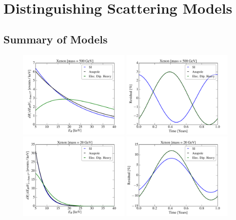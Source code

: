 \documentclass[11pt]{article}
\begin{document}
\section{Distinguishing Scattering Models}\label{sec:procedure}

\subsection{Summary of Models}


\begin{figure}
\centering
\includegraphics[width=0.49\textwidth, trim=0.cm 0.0cm 0.cm 0.0cm,clip=true]{plots/RecoilComparison_500GeV.pdf}
\includegraphics[width=0.49\textwidth, trim=0.cm 0.0cm 0.cm 0.0cm,clip=true]{plots/Xenon_SIvsAnapole_500GeV_Residual_Theory.pdf}
\includegraphics[width=0.49\textwidth, trim=0.cm 0.0cm 0.cm 0.0cm,clip=true]{plots/RecoilComparison_20GeV.pdf}
\includegraphics[width=0.49\textwidth, trim=0.cm 0.0cm 0.cm 0.0cm,clip=true]{plots/Xenon_SIvsAnapole_20GeV_Residual_Theory.pdf}

\end{figure}
\end{document}

